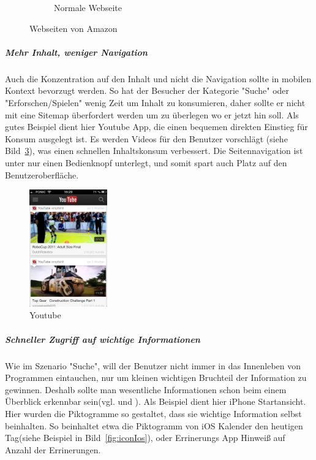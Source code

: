 \begin{figure}
\begin{subfigure}[b]{0.6\textwidth}
		\caption{Normale Webseite}\label{fig:amazonFull}
	\end{subfigure}
	\caption{Webseiten von Amazon}\label{fig:amazonSites}
\end{figure}

\subparagraph{Mehr Inhalt, weniger Navigation} 
\label{subp:entferne_das_fett} 

Auch die Konzentration auf den Inhalt und nicht die Navigation sollte in mobilen Kontext bevorzugt werden\cite[Seite 52]{mobileFirst}. So hat der Besucher der Kategorie "Suche" oder "Erforschen/Spielen"  wenig Zeit um Inhalt zu konsumieren, daher sollte er nicht mit eine Sitemap überfordert werden um zu überlegen wo er jetzt hin soll. Als gutes Beispiel dient hier Youtube App, die einen bequemen direkten Einstieg für Konsum ausgelegt ist. Es werden Videos für den Benutzer vorschlägt (siehe Bild~\ref{fig:youtube}), was einen schnellen Inhaltskonsum verbessert. Die Seitennavigation ist unter nur einen Bedienknopf unterlegt, und somit spart auch Platz auf den Benutzeroberfläche.

\begin{figure}
	\begin{center}
	\includegraphics[width=0.3\textwidth]{img/youtube.png}
	\caption{Youtube}\label{fig:youtube}
\end{center}
\end{figure}

\subparagraph{Schneller Zugriff auf wichtige Informationen} 
\label{subp:subparagraph_name}

Wie im Szenario "Suche", will der Benutzer nicht immer in das Innenleben von Programmen eintauchen, nur um kleinen wichtigen Bruchteil der Information zu gewinnen. Deshalb sollte man wesentliche Informationen schon beim einem Überblick erkennbar sein(vgl. \cite[Seite 54]{mobileFrontier} und \cite{Neil:2012uf}). Als Beispiel dient hier iPhone Startansicht. Hier wurden die Piktogramme so gestaltet, dass sie wichtige Information selbst beinhalten. So beinhaltet etwa die Piktogramm von iOS Kalender den heutigen Tag(siehe Beispiel in Bild~\ref{fig:iconIos}), oder Errinerungs App Hinweiß auf Anzahl der Errinerungen.

